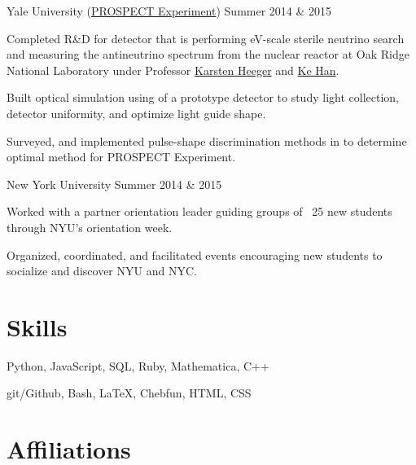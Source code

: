 \documentclass{cultvoucher}
\begin{document}
         {Yale University (\href{http://prospect.yale.edu/}{PROSPECT Experiment})}
         {Summer 2014 \& 2015}
\begin{tightitemize}
    \item Completed R\&D for detector that is performing eV-scale sterile
          neutrino search and measuring the antineutrino spectrum from the
          nuclear reactor at Oak Ridge National Laboratory under Professor
          \href{http://heegerlab.yale.edu/karsten-heeger}{Karsten Heeger} and
          \href{https://www.physics.sjtu.edu.cn/en/people/1/kehan}{Ke Han}.
    \item Built optical simulation using  of a prototype detector
          to study light collection, detector uniformity, and optimize light
          guide shape.
    \item Surveyed, and implemented pulse-shape discrimination methods in
           to determine optimal method for PROSPECT Experiment.
\end{tightitemize}

         {New York University}
         {Summer 2014 \& 2015}
\begin{tightitemize}
    \item Worked with a partner orientation leader guiding groups of ~25 new
          students through NYU's orientation week.
    \item Organized, coordinated, and facilitated events encouraging new
          students to socialize and discover NYU and NYC.
\end{tightitemize}


\section{Skills}\vspace{-0.9\topsep}
         {}
         {Python, JavaScript, SQL, Ruby, Mathematica, C++}

         {}
         {git/Github, Bash, \LaTeX{}, Chebfun, HTML, CSS}

\vspace{-2\topsep}

\section{Affiliations}\vspace{-0.9\topsep}
\end{document}
